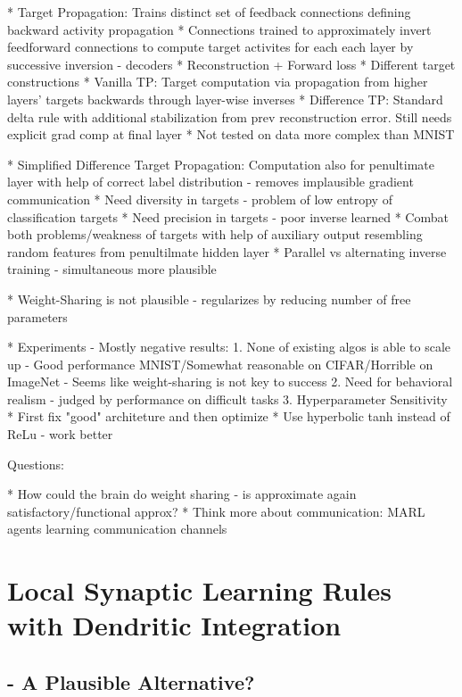 \documentclass{article}
\theoremstyle{definition}
\begin{document}
* Target Propagation: Trains distinct set of feedback connections defining backward activity propagation
    * Connections trained to approximately invert feedforward connections to compute target activites for each each layer by successive inversion - decoders
        * Reconstruction + Forward loss
        * Different target constructions
    * Vanilla TP: Target computation via propagation from higher layers' targets backwards through layer-wise inverses
    * Difference TP: Standard delta rule with additional stabilization from prev reconstruction error. Still needs explicit grad comp at final layer
    * Not tested on data more complex than MNIST

* Simplified Difference Target Propagation: Computation also for penultimate layer with help of correct label distribution - removes implausible gradient communication
    * Need diversity in targets - problem of low entropy of classification targets
    * Need precision in targets - poor inverse learned
    * Combat both problems/weakness of targets with help of auxiliary output resembling random features from penultilmate hidden layer
    * Parallel vs alternating inverse training - simultaneous more plausible

* Weight-Sharing is not plausible - regularizes by reducing number of free parameters

* Experiments - Mostly negative results:
    1. None of existing algos is able to scale up - Good performance MNIST/Somewhat reasonable on CIFAR/Horrible on ImageNet - Seems like weight-sharing is not key to success
    2. Need for behavioral realism - judged by performance on difficult tasks
    3. Hyperparameter Sensitivity
        * First fix "good" architeture and then optimize
        * Use hyperbolic tanh instead of ReLu - work better


Questions:

* How could the brain do weight sharing - is approximate again satisfactory/functional approx?
* Think more about communication: MARL agents learning communication channels

\newpage
\section{Local Synaptic Learning Rules with Dendritic Integration}

\subsection*{\citet{guerguiev2017} - A Plausible Alternative?}
\end{document}

